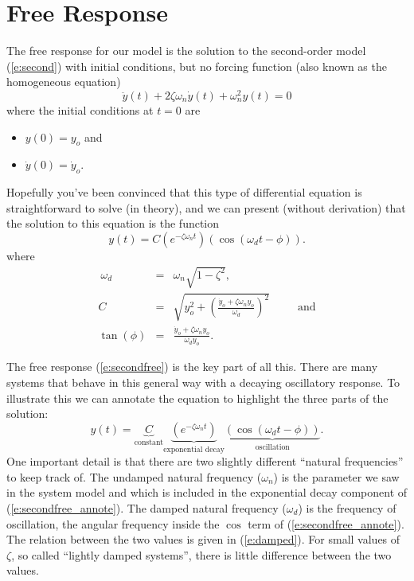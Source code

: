 \section{Free Response}\label{s:secondfree}
The free response for our model is the solution to the second-order model (\ref{e:second}) with initial conditions, but no forcing function (also known as the homogeneous equation)
\begin{equation} \label{e:secondhomo}
\ddot{y}(t) + 2 \zeta \omega_n \dot{y}(t) + \omega_n^2 y(t) = 0
\end{equation} 
where the initial conditions at $t=0$ are
\begin{itemize}
\item $y(0) = y_o$ and 
\item $\dot{y}(0)=\dot{y}_o$.
\end{itemize}
Hopefully you've been convinced that this type of differential equation is straightforward to solve (in theory), and we can present (without derivation) that the solution to this equation is the function
\begin{equation} \label{e:secondfree}
y(t) = C \left(e^{-\zeta \omega_n t}\right) \left( \cos(\omega_d t - \phi) \right).
\end{equation}
where
\begin{eqnarray}\
\omega_d & = & \omega_n \sqrt{1-\zeta^2}, \label{e:damped} \\
C & = & \sqrt{ y_o^2 + \left( \frac{\dot{y}_o+\zeta\omega_n y_o}{\omega_d} \right)^2 } \;\;\;\;\;\;\;\;\; \mathrm{and}\label{e:C} \\
\tan(\phi) & = & \frac{\dot{y}_o+\zeta \omega_n y_o}{\omega_d y_o}. \label{e:phi}
\end{eqnarray}

The free response (\ref{e:secondfree}) is the key part of all this.  There are many systems that behave in this general way with a decaying oscillatory response.  To illustrate this we can annotate the equation to highlight the three parts of the solution:
\begin{equation} \label{e:secondfree_annote}
y(t) = \underbrace{C}_\text{constant} 
\underbrace{\left(e^{-\zeta \omega_n t}\right)}_\text{exponential decay}
\underbrace{\left( \cos(\omega_d t - \phi) \right)}_\text{oscillation}.
\end{equation}
One important detail is that there are two slightly different ``natural frequencies'' to keep track of.  The \gls{undamped natural frequency} ($\omega_n$) is the parameter we saw in the system model and which is included in the exponential decay component of (\ref{e:secondfree_annote}).  The \gls{damped natural frequency} ($\omega_d$) is the frequency of oscillation, the angular frequency inside the $\cos$ term of (\ref{e:secondfree_annote}).  The relation between the two values is given in (\ref{e:damped}).  For small values of $\zeta$, so called ``lightly damped systems'', there is little difference between the two values.

